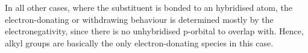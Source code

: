 				In all other cases, where the substituent is bonded to an \spthree hybridised atom, the electron-donating or withdrawing
				behaviour is determined mostly by the electronegativity, since there is no unhybridised p-orbital to overlap with. Hence,
				alkyl groups are basically the only electron-donating species in this case.















